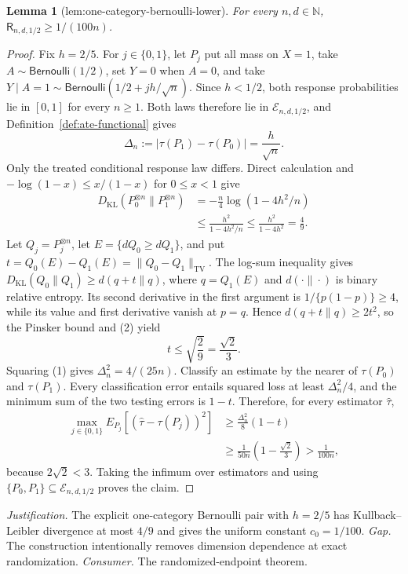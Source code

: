 \documentclass{article}
\newtheorem{lemma}{Lemma}
\begin{document}
\begin{lemma}[lem:one-category-bernoulli-lower]\label{lem:one-category-bernoulli-lower}
For every \(n,d\in\mathbb N\), \(\mathsf R_{n,d,1/2}\ge1/(100n)\).
\end{lemma}
\begin{proof}
Fix \(h=2/5\). For \(j\in\{0,1\}\), let \(P_j\) put all mass on \(X=1\), take \(A\sim\mathsf{Bernoulli}(1/2)\), set \(Y=0\) when \(A=0\), and take \(Y\mid A=1\sim\mathsf{Bernoulli}(1/2+jh/\sqrt n)\). Since \(h<1/2\), both response probabilities lie in \([0,1]\) for every \(n\ge1\). Both laws therefore lie in \(\mathcal E_{n,d,1/2}\), and Definition~\ref{def:ate-functional} gives
\[
\Delta_n:=|\tau(P_1)-\tau(P_0)|=\frac h{\sqrt n}.
\tag{1}
\]
Only the treated conditional response law differs. Direct calculation and \(-\log(1-x)\le x/(1-x)\) for \(0\le x<1\) give
\[
\begin{aligned}
D_{\mathrm{KL}}(P_0^{\otimes n}\|P_1^{\otimes n})
&=-\frac n4\log(1-4h^2/n)\\
&\le\frac{h^2}{1-4h^2/n}\le\frac{h^2}{1-4h^2}=\frac49.
\end{aligned}
\tag{2}
\]
Let \(Q_j=P_j^{\otimes n}\), let \(E=\{dQ_0\ge dQ_1\}\), and put \(t=Q_0(E)-Q_1(E)=\|Q_0-Q_1\|_{\mathrm{TV}}\). The log-sum inequality gives \(D_{\mathrm{KL}}(Q_0\|Q_1)\ge d(q+t\|q)\), where \(q=Q_1(E)\) and \(d(\cdot\|\cdot)\) is binary relative entropy. Its second derivative in the first argument is \(1/\{p(1-p)\}\ge4\), while its value and first derivative vanish at \(p=q\). Hence \(d(q+t\|q)\ge2t^2\), so the Pinsker bound and (2) yield
\[
t\le\sqrt{\frac{2}{9}}=\frac{\sqrt2}{3}.
\tag{3}
\]
Squaring (1) gives \(\Delta_n^2=4/(25n)\). Classify an estimate by the nearer of \(\tau(P_0)\) and \(\tau(P_1)\). Every classification error entails squared loss at least \(\Delta_n^2/4\), and the minimum sum of the two testing errors is \(1-t\). Therefore, for every estimator \(\widehat\tau\),
\[
\begin{aligned}
\max_{j\in\{0,1\}}E_{P_j}[(\widehat\tau-\tau(P_j))^2]
&\ge\frac{\Delta_n^2}{8}(1-t)\\
&\ge\frac1{50n}\left(1-\frac{\sqrt2}{3}\right)>\frac1{100n},
\end{aligned}
\tag{4}
\]
because \(2\sqrt2<3\). Taking the infimum over estimators and using \(\{P_0,P_1\}\subseteq\mathcal E_{n,d,1/2}\) proves the claim.
\end{proof}
\par\smallskip\noindent \textit{Justification.} The explicit one-category Bernoulli pair with \(h=2/5\) has Kullback--Leibler divergence at most \(4/9\) and gives the uniform constant \(c_0=1/100\). \textit{Gap.} The construction intentionally removes dimension dependence at exact randomization. \textit{Consumer.} The randomized-endpoint theorem.
\end{document}
